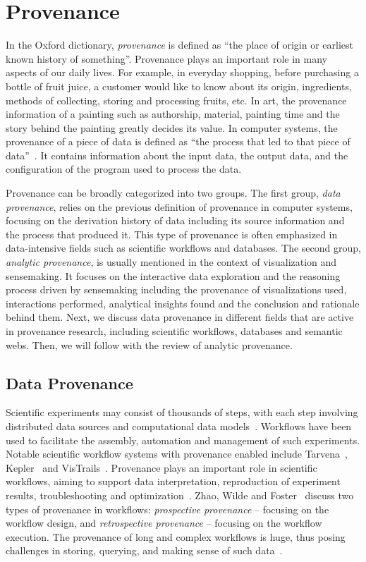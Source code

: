 \section{Provenance}
In the Oxford dictionary, \emph{provenance} is defined as ``the place of origin or earliest known history of something''. Provenance plays an important role in many aspects of our daily lives. For example, in everyday shopping, before purchasing a bottle of fruit juice, a customer would like to know about its origin, ingredients, methods of collecting, storing and processing fruits, etc. In art, the provenance information of a painting such as authorship, material, painting time and the story behind the painting greatly decides its value. In computer systems, the provenance of a piece of data is defined as ``the process that led to that piece of data''~\cite{Moreau2011}. It contains information about the input data, the output data, and the configuration of the program used to process the data.

Provenance can be broadly categorized into two groups. The first group, \emph{data provenance}, relies on the previous definition of provenance in computer systems, focusing on the derivation history of data including its source information and the process that produced it. This type of provenance is often emphasized in data-intensive fields such as scientific workflows and databases. The second group, \emph{analytic provenance}, is usually mentioned in the context of visualization and sensemaking. It focuses on the interactive data exploration and the reasoning process driven by sensemaking including the provenance of visualizations used, interactions performed, analytical insights found and the conclusion and rationale behind them. Next, we discuss data provenance in different fields that are active in provenance research, including scientific workflows, databases and semantic webs. Then, we will follow with the review of analytic provenance.

\subsection{Data Provenance}
\label{sub:lr-data-provenance}
Scientific experiments may consist of thousands of steps, with each step involving distributed data sources and computational data models~\cite{Gil2007}. Workflows have been used to facilitate the assembly, automation and management of such experiments. Notable scientific workflow systems with provenance enabled include Tarvena~\cite{Zhao2008}, Kepler~\cite{Bowers2006} and VisTrails~\cite{Bavoil2005}. Provenance plays an important role in scientific workflows, aiming to support data interpretation, reproduction of experiment results, troubleshooting and optimization~\cite{Miles2007}. Zhao, Wilde and Foster~\cite{Zhao2006} discuss two types of provenance in workflows: \emph{prospective provenance} -- focusing on the workflow design, and \emph{retrospective provenance} -- focusing on the workflow execution. The provenance of long and complex workflows is huge, thus posing challenges in storing, querying, and making sense of such data~\cite{Davidson2007}.

